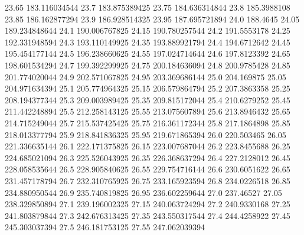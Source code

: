           23.65    183.116034544
           23.7    183.875389425
          23.75    184.636314844
           23.8      185.3988108
          23.85    186.162877294
           23.9    186.928514325
          23.95    187.695721894
           24.0         188.4645
          24.05    189.234848644
           24.1    190.006767825
          24.15    190.780257544
           24.2      191.5553178
          24.25    192.331948594
           24.3    193.110149925
          24.35    193.889921794
           24.4      194.6712642
          24.45    195.454177144
           24.5    196.238660625
          24.55    197.024714644
           24.6      197.8123392
          24.65    198.601534294
           24.7    199.392299925
          24.75    200.184636094
           24.8      200.9785428
          24.85    201.774020044
           24.9    202.571067825
          24.95    203.369686144
           25.0       204.169875
          25.05    204.971634394
           25.1    205.774964325
          25.15    206.579864794
           25.2      207.3863358
          25.25    208.194377344
           25.3    209.003989425
          25.35    209.815172044
           25.4      210.6279252
          25.45    211.442248894
           25.5    212.258143125
          25.55    213.075607894
           25.6      213.8946432
          25.65    214.715249044
           25.7    215.537425425
          25.75    216.361172344
           25.8      217.1864898
          25.85    218.013377794
           25.9    218.841836325
          25.95    219.671865394
           26.0       220.503465
          26.05    221.336635144
           26.1    222.171375825
          26.15    223.007687044
           26.2      223.8455688
          26.25    224.685021094
           26.3    225.526043925
          26.35    226.368637294
           26.4      227.2128012
          26.45    228.058535644
           26.5    228.905840625
          26.55    229.754716144
           26.6      230.6051622
          26.65    231.457178794
           26.7    232.310765925
          26.75    233.165923594
           26.8      234.0226518
          26.85    234.880950544
           26.9    235.740819825
          26.95    236.602259644
           27.0        237.46527
          27.05    238.329850894
           27.1    239.196002325
          27.15    240.063724294
           27.2      240.9330168
          27.25    241.803879844
           27.3    242.676313425
          27.35    243.550317544
           27.4      244.4258922
          27.45    245.303037394
           27.5    246.181753125
          27.55    247.062039394
